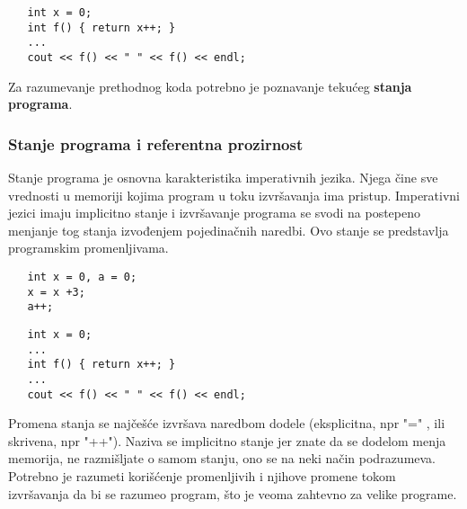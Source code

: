 \documentclass[../main.tex]{subfiles}
\begin{document}
	   \begin{multicols}{2}
	   
	   \begin{boxprimer}
	   \begin{Verbatim}
   int x = 0;
   int f() { return x++; }
   ...
   cout << f() << " " << f() << endl;
	   \end{Verbatim}
	   \end{boxprimer}
	   \columnbreak
	   Za razumevanje prethodnog koda potrebno je poznavanje tekućeg {\bf stanja programa}.
	   
	   \end{multicols}
	   
	   \subsubsection{Stanje programa i referentna prozirnost}				%
	   
	   Stanje programa je osnovna karakteristika imperativnih jezika. Njega čine sve vrednosti u memoriji kojima program u toku izvršavanja ima pristup. Imperativni jezici imaju implicitno stanje i izvršavanje programa se svodi na postepeno menjanje tog stanja izvođenjem pojedinačnih naredbi. Ovo stanje se predstavlja programskim promenljivama.
	   
	  \begin{multicols}{2}
	  \begin{boxprimer}
	   \begin{Verbatim}
   int x = 0, a = 0;		
   x = x +3;			
   a++;			     
	   \end{Verbatim}
	   \end{boxprimer}
	   \columnbreak
	   \begin{boxprimer}	
	   \begin{Verbatim}
   int x = 0;
   ...
   int f() { return x++; }
   ...
   cout << f() << " " << f() << endl;
	   \end{Verbatim}
	   \end{boxprimer}
	   \end{multicols}
	   
	   Promena stanja se najčešće izvršava naredbom dodele (eksplicitna, npr "=" , ili skrivena, npr "++"). Naziva se implicitno stanje jer znate da se dodelom menja memorija, ne razmišljate o samom stanju, ono se na neki način podrazumeva. Potrebno je razumeti korišćenje promenljivih i njihove promene tokom izvršavanja da bi se razumeo program, što je veoma zahtevno za velike programe.
	   
\end{document}
